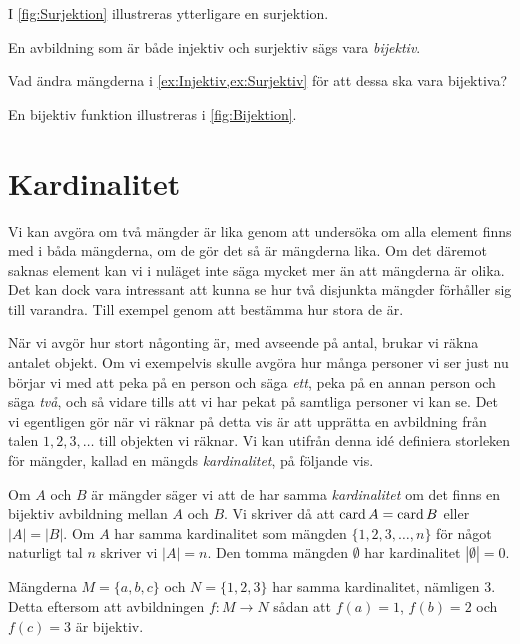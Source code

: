 I \cref{fig:Surjektion} illustreras ytterligare en surjektion.

\begin{definition}
  En avbildning som är både injektiv och surjektiv sägs vara
  \emph{bijektiv}.
\end{definition}
\begin{exercise}
  Vad ändra mängderna i \cref{ex:Injektiv,ex:Surjektiv} för att dessa ska vara 
  bijektiva?
\end{exercise}

En bijektiv funktion illustreras i \cref{fig:Bijektion}.

\section{Kardinalitet}
Vi kan avgöra om två mängder är lika genom att undersöka om alla
element finns med i båda mängderna, om de gör det så är mängderna lika.
Om det däremot saknas element kan vi i nuläget inte säga mycket mer än att
mängderna är olika.
Det kan dock vara intressant att kunna se hur två disjunkta mängder förhåller
sig till varandra.
Till exempel genom att bestämma hur stora de är.

När vi avgör hur stort någonting är, med avseende på antal, brukar vi räkna
antalet objekt.
Om vi exempelvis skulle avgöra hur många personer vi ser just nu börjar vi med
att peka på en person och säga \emph{ett}, peka på en annan person och säga
\emph{två}, och så vidare tills att vi har pekat på samtliga personer vi kan se.
Det vi egentligen gör när vi räknar på detta vis är att upprätta en avbildning
från talen \(1,2,3,\ldots\) till objekten vi räknar.
Vi kan utifrån denna idé definiera storleken för mängder, kallad en mängds
\emph{kardinalitet}, på följande vis.
\begin{definition}\label{def:Kardinalitet}
  Om \(A\) och \(B\) är mängder säger vi att de har samma \emph{kardinalitet}
  om det finns en bijektiv avbildning mellan \(A\) och \(B\).
  Vi skriver då att \(\operatorname{card} A = \operatorname{card} B\) eller \(|A| = |B|\).
  Om \(A\) har samma kardinalitet som mängden \(\{1,2,3,\ldots,n\}\) för
  något naturligt tal \(n\) skriver vi \(|A| = n\).
  Den tomma mängden \(\emptyset\) har kardinalitet \(|\emptyset| = 0\).
\end{definition}

\begin{example}
  Mängderna \(M=\{a,b,c\}\) och \(N=\{1,2,3\}\) har samma kardinalitet,
  nämligen \(3\).
  Detta eftersom att avbildningen \(f\colon M\to N\) sådan att \(f(a)=1\),
  \(f(b)=2\) och \(f(c)=3\) är bijektiv.
\end{example}


